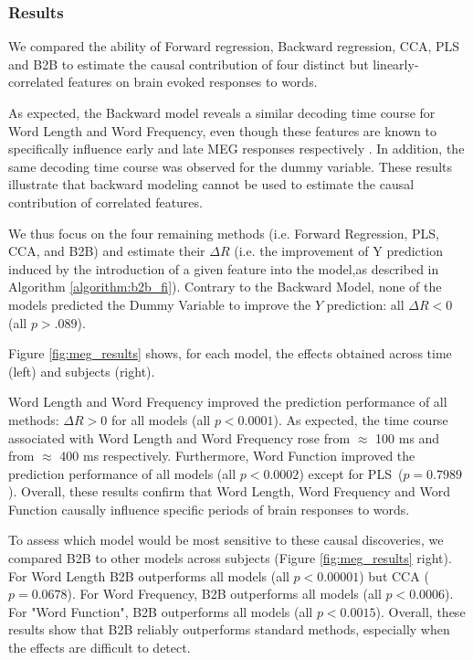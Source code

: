 \subsubsection{Results}
We compared the ability of Forward regression, Backward regression, CCA, PLS and
B2B to estimate the causal contribution of four distinct but linearly-correlated features
on brain evoked responses to words.

As expected, the Backward model reveals a similar decoding time course for Word
Length and Word Frequency, even though these features are known to specifically
influence early and late MEG responses respectively \citep{kutas2011thirty}. In
addition, the same decoding time course was observed for the dummy variable.
These results illustrate that backward modeling cannot be used to estimate the
causal contribution of correlated features.

We thus focus on the four remaining methods (i.e. Forward Regression, PLS, CCA,
and B2B) and estimate their $\Delta R$ (i.e. the improvement of Y prediction
induced by the introduction of a given feature into the model,as described in
Algorithm \ref{algorithm:b2b_fi}). Contrary to the Backward Model, none of the
models predicted the Dummy Variable to improve the $Y$ prediction: all $\Delta R
< 0$ (all $p > .089$).

Figure \ref{fig:meg_results} shows, for each model, the effects obtained across
time (left) and subjects (right).

Word Length and Word Frequency improved the prediction performance of all
methods: $\Delta R>0$ for all models (all $p<0.0001$). As expected, the time
course associated with Word Length and Word Frequency rose from $\approx$ 100 ms
and from $\approx$ 400 ms respectively. Furthermore, Word Function improved the
prediction performance of all models (all $p < 0.0002$) except for
PLS~($p=0.7989$). Overall, these results confirm that Word Length, Word
Frequency and Word Function causally influence specific periods of brain
responses to words.

To assess which model would be most sensitive to these causal discoveries, we
compared B2B to other models across subjects (Figure \ref{fig:meg_results}
right). For Word Length B2B outperforms all models (all $p < 0.00001$) but CCA
($p=0.0678$). For Word Frequency, B2B outperforms all models (all $p < 0.0006$).
For "Word Function", B2B outperforms all models (all $p < 0.0015$). Overall,
these results show that B2B reliably outperforms standard methods, especially
when the effects are difficult to detect.
